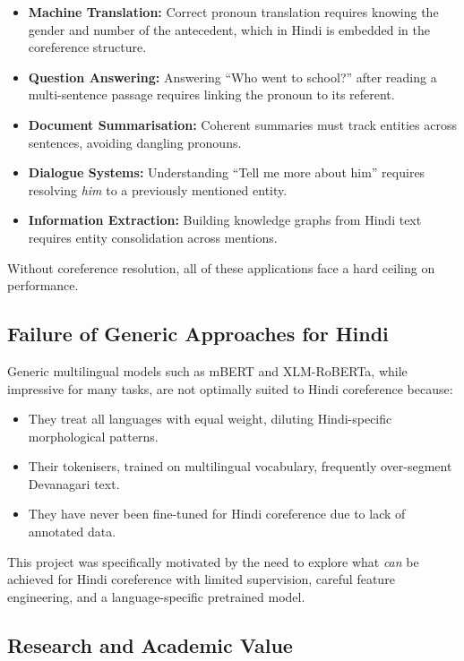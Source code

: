 \documentclass[12pt,a4paper]{report}
\begin{document}
\begin{itemize}
    \item \textbf{Machine Translation:} Correct pronoun translation requires knowing the gender and number of the antecedent, which in Hindi is embedded in the coreference structure.
    \item \textbf{Question Answering:} Answering ``Who went to school?'' after reading a multi-sentence passage requires linking the pronoun to its referent.
    \item \textbf{Document Summarisation:} Coherent summaries must track entities across sentences, avoiding dangling pronouns.
    \item \textbf{Dialogue Systems:} Understanding ``Tell me more about him'' requires resolving \textit{him} to a previously mentioned entity.
    \item \textbf{Information Extraction:} Building knowledge graphs from Hindi text requires entity consolidation across mentions.
\end{itemize}

Without coreference resolution, all of these applications face a hard ceiling on performance.

\subsection{Failure of Generic Approaches for Hindi}

Generic multilingual models such as mBERT and XLM-RoBERTa, while impressive for many tasks, are not optimally suited to Hindi coreference because:
\begin{itemize}
    \item They treat all languages with equal weight, diluting Hindi-specific morphological patterns.
    \item Their tokenisers, trained on multilingual vocabulary, frequently over-segment Devanagari text.
    \item They have never been fine-tuned for Hindi coreference due to lack of annotated data.
\end{itemize}

This project was specifically motivated by the need to explore what \textit{can} be achieved for Hindi coreference with limited supervision, careful feature engineering, and a language-specific pretrained model.

\subsection{Research and Academic Value}
\end{document}
